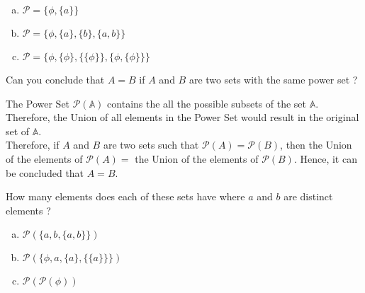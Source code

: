 \documentclass[addpoints]{exam}
\newenvironment{problem}[2][Problem]{\begin{trivlist}
\item[\hskip \labelsep {\bfseries #1}\hskip \labelsep {\bfseries #2.}]}{\end{trivlist}}
\begin{document}
\begin{sloppypar}
    \begin{questions}
        \question
        \begin{solution}
            
            \begin{enumerate}[(a)]
                \item $ \mathcal{P} = \{\phi, \{a\}\} $
                \item $ \mathcal{P} = \{ \phi, \{a\}, \{b\}, \{a, b\} \} $
                \item $ \mathcal{P} = \{ \phi, \{\phi\}, \{\{\phi\}\}, \{ \phi, \{ \phi \} \} \} $
            \end{enumerate}
        \end{solution}
    \end{questions}
    
    \begin{problem}{3}[Chapter 2.1, Question 22]
    Can you conclude that $A = B$ if $A$ and $B$ are two sets with the same power set ?
    \end{problem}
    
    \begin{questions}
        \question
        \begin{solution}
            
            The Power Set $ \mathcal{P}(\mathbb{A}) $ contains the all the possible subsets of the set $ \mathbb{A} $. Therefore, the Union of all elements in the Power Set would result in the original set of $ \mathbb{A} $. \\ Therefore, if $A$ and $B$ are two sets such that $ \mathcal{P}(A) = \mathcal{P}(B) $, then the Union of the elements of $\mathcal{P}(A) = $ the Union of the elements of $\mathcal{P}(B)$. Hence, it can be concluded that $ A = B $.  
        \end{solution}
    \end{questions}
    
    \begin{problem}{4}[Chapter 2.1, Question 23]
    How many elements does each of these sets have where $a$ and $b$ are distinct elements ?
    \begin{enumerate}[(a)]
        \item $ \mathcal{P}(\{a,b,\{a,b\}\})$
        \item $ \mathcal{P}(\{\phi,a,\{a\}, \{\{a\} \}\})$
        \item $ \mathcal{P}(\mathcal{P}(\phi))$
    \end{enumerate}
    \end{problem}


\end{sloppypar}
\end{document}
